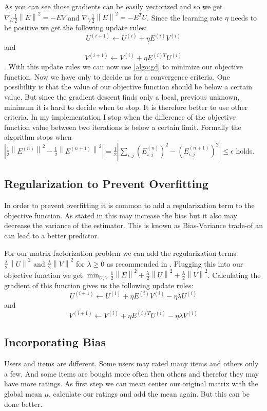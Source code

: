 \documentclass[DIV=14,twocolumn]{scrartcl}
\newcommand{\norm}[1]{\left\lVert#1\right\rVert}
\begin{document}
As you can see those gradients can be easily vectorized and so we get $\nabla_U \frac{1}{2}\norm{E}^2=-EV$ and  $\nabla_V \frac{1}{2}\norm{E}^2=-E^TU$. Since the learning rate $\eta$ needs to be positive we get the following update rules: \[U^{(i+1)} \leftarrow U^{(i)} + \eta E^{(i)}V^{(i)}\] and \[V^{(i+1)} \leftarrow V^{(i)} + \eta E^{(i)T}U^{(i)}\]. With this update rules we can now use \ref{algo:gd} to minimize our objective function. Now we have only to decide us for a convergence criteria. One possibility is that the value of our objective function should be below a certain value. But since the gradient descent finds only a local, previous unknown, minimum it is hard to decide when to stop. It is therefore better to use other criteria. In my implementation I stop when the difference of the objective function value between two iterations is below a certain limit. Formally the algorithm stops when $|\frac{1}{2}\norm{E^{(n)}}^2-\frac{1}{2}\norm{E^{(n+1)}}^2|=\frac{1}{2}|\sum_{i,j}(E_{i,j}^{(n)})^2-(E_{i,j}^{(n+1)})^2|\leq\epsilon$ holds.

\subsection{Regularization to Prevent Overfitting}
In order to prevent overfitting it is common to add a regularization term to the objective function. As stated in \cite{Gi19} this may increase the bias but it also may decrease the variance of the estimator. This is known as Bias-Variance trade-of an can lead to a better predictor. 

For our matrix factorization problem we can  add the regularization terms $\frac{\lambda}{2}\norm{U}^2$ and $\frac{\lambda}{2}\norm{V}^2$ for $\lambda \geq 0$ as recommended in \cite{Ag16}.
Plugging this into our objective function we get $\min_{U,V} \frac{1}{2}\norm{E}^2 + \frac{\lambda}{2}\norm{U}^2 + \frac{\lambda}{2}\norm{V}^2$. Calculating the gradient of this function gives us the following update rules: \[U^{(i+1)} \leftarrow U^{(i)} + \eta E^{(i)}V^{(i)} - \eta\lambda U^{(i)}\] and \[V^{(i+1)} \leftarrow V^{(i)} + \eta E^{(i)T}U^{(i)} - \eta\lambda V^{(i)}\]

\subsection{Incorporating Bias}
Users and items are different. Some users may rated many items and others only a few. And some items are bought more often then others and therefor they may have more ratings. 
As first step we can mean center our original matrix with the global mean $\mu$, calculate our ratings and add the mean again. But this can be done better.
\end{document}
